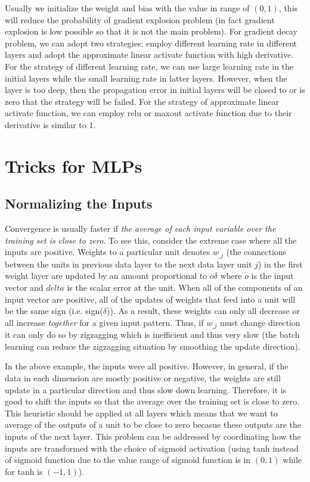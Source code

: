 \documentclass[runningheads,openany]{xhlPaper}
\begin{document}
Usually we initialize the weight and bias with the value in range of $(0, 1)$, this will reduce the probability of gradient explosion problem (in fact gradient explosion is low possible so that it is not the main problem). 
For gradient decay problem, we can adopt two strategies: employ different learning rate in different layers and adopt the approximate linear activate function with high derivative.
For the strategy of different learning rate, we can use large learning rate in the initial layers while the small learning rate in latter layers. However, when the layer is too deep, then the propagation error in initial layers will be closed to or is zero that the strategy will be failed.
For the strategy of approximate linear activate function, we can employ relu or maxout activate function due to their derivative is similar to $1$. 

\section{Tricks for MLPs}

\subsection{Normalizing the Inputs}
\label{sec:mlp_normlize_inputs}
Convergence is usually faster if \emph{the average of each input variable over the training set is close to zero}.
To see this, consider the extreme case where all the inputs are positive. 
Weights to a particular unit denotes ${w_{\_j}}$ (the connections between the units in previous data layer to the next data layer unit $j$) in the first weight layer are updated by an amount proportional  to $o\delta$ where $o$ is the input vector and $delta$ is the scalar error at the unit.
When all of the components of an input vector are positive, all of the updates of weights that feed into a unit will be the same sign (i.e. sign($\delta$)).
As a result, these weights can only all decrease or all increase \emph{together} for a given input pattern.
Thus, if $w_{\_j}$ must change direction it can only do so by zigzagging which is inefficient and thus very slow (the batch learning can reduce the zigzagging situation by smoothing the update direction).

In the above example, the inputs were all positive. However, in general, if the data in each dimension are mostly positive or negative, the weights are still update in a particular direction and thus slow down learning.
Therefore, it is good to shift the inputs so that the average over the training set is close to zero.
This heuristic should be applied at all layers which means that we want to average of the outputs of a unit to be close to zero becasue these outputs are the inputs of the next layer.
This problem can be addressed by coordinating how the inputs are transformed with the choice of sigmoid activation (using tanh instead of sigmoid function due to the value range of sigmoid function is in $\left(0, 1\right)$ while for tanh is $\left(-1, 1\right)$).
\end{document}
